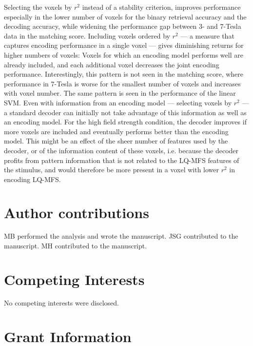 Selecting the voxels by $r^2$ instead of a stability criterion, improves
performance especially in the lower number of voxels for the binary retrieval
accuracy and the decoding accuracy, while widening the performance gap between 3- and 7-Tesla
data in the matching score. Including voxels ordered by $r^2$ --- a measure that captures
encoding performance in a single voxel --- gives diminishing returns for higher
numbers of voxels: Voxels for which an encoding model performs well are already
included, and each additional voxel decreases the joint encoding performance.
Interestingly, this pattern is not seen in the matching score, where
performance in 7-Tesla is worse for the smallest number of voxels and increases
with voxel number. The same pattern is seen in the performance of the linear
SVM. Even with information from an encoding model --- selecting voxels by
$r^2$ --- a standard decoder can initially not take advantage of this information
as well as an encoding model. For the high field strength condition, the
decoder improves if more voxels are included and eventually performs better than
the encoding model. This might be an effect of the sheer number of features used by the decoder, or of the information content of these voxels,
i.e. because the decoder profits from pattern information that is not related to
the LQ-MFS features of the stimulus, and would therefore be more present in a
voxel with lower $r^2$ in encoding LQ-MFS.


\section*{Author contributions}

MB performed the analysis and wrote the manuscript.
JSG contributed to the manuscript.
MH contributed to the manuscript.


\section*{Competing Interests}
No competing interests were disclosed.

\section*{Grant Information}

